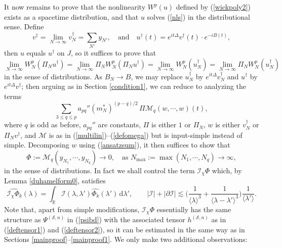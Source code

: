 \documentclass[11 pt,reqno]{amsart}
\theoremstyle{definition}
\theoremstyle{remark}
\numberwithin{equation}{section}
\newcommand{\Sc}{\mathcal{S}}
\newcommand{\Ic}{\mathcal{I}}
\renewcommand{\Mc}{\mathcal{M}}
\newcommand{\Rb}{\mathbb{R}}
\begin{document}
{It now remains to prove that the nonlinearity $W^p(u)$ defined by (\ref{wickpoly2}) exists as a spacetime distribution, and that $u$ solves (\ref{nls}) in the distributional sense. Define
\begin{equation}\label{defother}v^\dagger=\lim_{N\to\infty}v_N^\dagger=\sum_{N'}y_{N'},\quad\mathrm{and}\quad u^\dagger(t)=e^{it\Delta}v^{\dagger}(t)\cdot e^{-iB(t)},
\end{equation} then $u$ equals $u^\dagger$ on $J$, so it suffices to prove that
\begin{equation}\label{todolimit}\lim_{N\to\infty}W_N^p(\Pi_Nu^\dagger)=\lim_{N\to\infty}\Pi_NW_N^p(\Pi_Nu^\dagger)=\lim_{N\to\infty}W_N^p(u_N^\dagger)=\lim_{N\to\infty}\Pi_NW_N^p(u_N^\dagger)
\end{equation}in the sense of distributions. As $B_N\to B$, we may replace $u_N^\dagger$ by $e^{it\Delta}v_N^\dagger$ and $u^\dagger$ by $e^{it\Delta}v^\dagger$; then arguing as in Section \ref{condition1}, we can reduce to analyzing the terms
\begin{equation}\label{terms}\sum_{3\leq q \leq p}a_{pq}''(m_N^*)^{(p-q)/2}\,\Pi\Mc_q(w,\cdots,w)(t),
\end{equation} where $q$ is odd as before, $a_{pq}''$ are constants, $\Pi$ is either $1$ or $\Pi_N$, $w$ is either $v_N^\dagger$ or $\Pi_Nv^\dagger$, and $\Mc$ is as in (\ref{multilin})--(\ref{defomega}) but is input-simple instead of simple. Decomposing $w$ using (\ref{ansatzsum}), it then suffices to show that
\begin{equation}\label{terms2}\Phi:=\Mc_q(y_{N_1},\cdots,y_{N_q})\to 0,\quad \textrm{as }N_{\mathrm{max}}:=\max(N_1,\cdots,N_q)\to\infty,
\end{equation}in the sense of distributions. In fact we shall control the term $\Ic_\chi\Phi$ which, by Lemma \ref{duhamelform0}, satisfies \begin{equation}\label{duhamelPhi}\widehat{\Ic_\chi\Phi_k}(\lambda)=\int_\Rb\Ic(\lambda,\lambda')\widehat{\Phi_k}(\lambda')\,\mathrm{d}\lambda',\qquad |\Ic|+|\partial\Ic|\lesssim\bigg(\frac{1}{\langle\lambda\rangle^3}+\frac{1}{\langle\lambda-\lambda'\rangle^3}\bigg)\frac{1}{\langle\lambda'\rangle}.\end{equation}Note that, apart from simple modifications, $\Ic_\chi\Phi$ essentially has the same structure as $\Psi^{(\Sc,n)}$ in (\ref{psibd}) with the associated tensor $h^{(\Sc,n)}$ as in (\ref{deftensor1}) and (\ref{deftensor2}), so it can be estimated in the same way as in Sections \ref{mainproof}--\ref{mainproof1}. We only make two additional observations:
}
\end{document}
